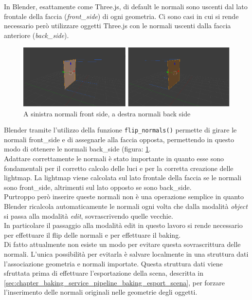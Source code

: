 In Blender, esattamente come Three.js, di default le normali sono uscenti dal lato frontale della faccia (\emph{front\_side}) di ogni geometria. 
Ci sono casi in cui si rende necessario però utilizzare oggetti Three.js con le normali uscenti dalla faccia anteriore (\emph{back\_side}).
\\
\begin{figure}[htb]
 \centering
 \includegraphics[width=1\linewidth]{images/chapter_baking_service/front_back_side.png}\hfill
 \caption[Front side e back side in Blender.]{A sinistra normali front side, a destra normali back side}
 \label{fig:baking_service_front_back_side}
\end{figure}
Blender tramite l’utilizzo della funzione \texttt{flip\_normals()} permette di girare le normali front\_side e di assegnarle alla faccia opposta, permettendo in questo modo di ottenere le normali back\_side (figura: \ref{fig:baking_service_front_back_side}. 
\\
Adattare correttamente le normali è stato importante in quanto esse sono fondamentali per il corretto calcolo delle luci e per la corretta creazione delle lightmap.
La lightmap viene calcolata sul lato frontale della faccia se le normali sono front\_side, altrimenti sul lato opposto se sono back\_side.
\\
Purtroppo però inserire queste normali non è una operazione semplice in quanto Blender ricalcola automaticamente le normali ogni volta che dalla modalità \emph{object} si passa alla modalità \emph{edit}, sovrascrivendo quelle vecchie.
\\
In particolare il passaggio alla modalità edit in questo lavoro si rende necessario per effettuare il flip delle normali e per effettuare il baking.
\\
Di fatto attualmente non esiste un modo per evitare questa sovrascrittura delle normali. L’unica possibilità per evitarla è salvare localmente in una struttura dati l’associazione geometria e normali importate. Questa struttura dati viene sfruttata prima di effettuare l’esportazione della scena, descritta in \ref{sec:chapter_baking_service_pipeline_baking_esport_scena}, per forzare l’inserimento delle normali originali nelle geometrie degli oggetti.
